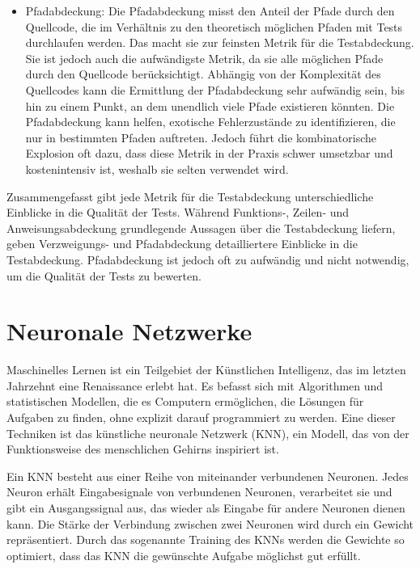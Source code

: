 \begin{itemize}
    \item
    Pfadabdeckung: Die Pfadabdeckung misst den Anteil der Pfade durch den Quellcode, die im Verhältnis zu den theoretisch möglichen Pfaden mit Tests durchlaufen werden.
    Das macht sie zur feinsten Metrik für die Testabdeckung.
    Sie ist jedoch auch die aufwändigste Metrik, da sie alle möglichen Pfade durch den Quellcode berücksichtigt.
    Abhängig von der Komplexität des Quellcodes kann die Ermittlung der Pfadabdeckung sehr aufwändig sein, bis hin zu einem Punkt, an dem unendlich viele Pfade existieren könnten.
    Die Pfadabdeckung kann helfen, exotische Fehlerzustände zu identifizieren, die nur in bestimmten Pfaden auftreten.
    Jedoch führt die kombinatorische Explosion oft dazu, dass diese Metrik in der Praxis schwer umsetzbar und kostenintensiv ist, weshalb sie selten verwendet wird.

\end{itemize}

Zusammengefasst gibt jede Metrik für die Testabdeckung unterschiedliche Einblicke in die Qualität der Tests.
Während Funktions-, Zeilen- und Anweisungsabdeckung grundlegende Aussagen über die Testabdeckung liefern, geben Verzweigungs- und Pfadabdeckung detailliertere Einblicke in die Testabdeckung.
Pfadabdeckung ist jedoch oft zu aufwändig und nicht notwendig, um die Qualität der Tests zu bewerten.

\section{Neuronale Netzwerke}
\label{subsec:Foundations:NeuralNetworks}

Maschinelles Lernen ist ein Teilgebiet der Künstlichen Intelligenz, das im letzten Jahrzehnt eine Renaissance erlebt hat.
Es befasst sich mit Algorithmen und statistischen Modellen, die es Computern ermöglichen, die Lösungen für Aufgaben zu finden, ohne explizit darauf programmiert zu werden.
Eine dieser Techniken ist das künstliche neuronale Netzwerk (KNN), ein Modell, das von der Funktionsweise des menschlichen Gehirns inspiriert ist.

Ein KNN besteht aus einer Reihe von miteinander verbundenen Neuronen.
Jedes Neuron erhält Eingabesignale von verbundenen Neuronen, verarbeitet sie und gibt ein Ausgangssignal aus, das wieder als Eingabe für andere Neuronen dienen kann.
Die Stärke der Verbindung zwischen zwei Neuronen wird durch ein Gewicht repräsentiert.
Durch das sogenannte Training des KNNs werden die Gewichte so optimiert, dass das KNN die gewünschte Aufgabe möglichst gut erfüllt.

